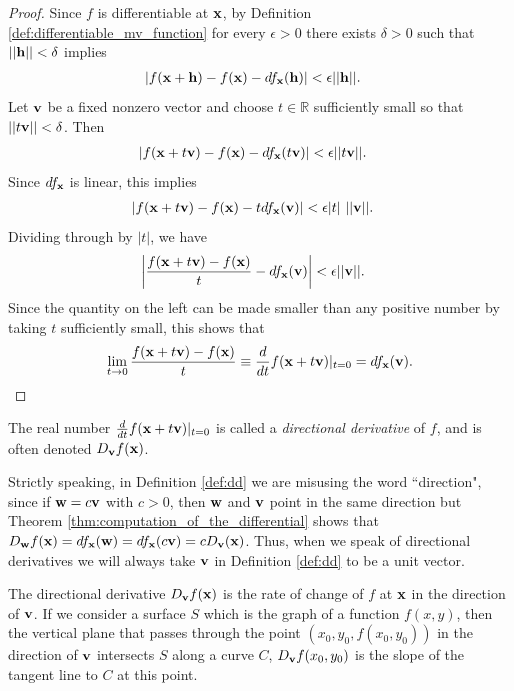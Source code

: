 \documentclass[12pt,letterpaper,reqno]{article}
\numberwithin{equation}{section}
\newcommand{\bh}{{\bf h}}
\newcommand{\R}{\ensuremath{\mathbb R}}
\newcommand{\bv}{{\bf v}}
\newcommand{\bw}{{\bf w}}
\newcommand{\bx}{{\bf x}}
\begin{document}
{\begin{proof}
	Since $f$ is differentiable at $\bx$, by Definition \ref{def:differentiable_mv_function} for every $\epsilon>0$ there exists $\delta>0$ such that $||\bh||<\delta$ implies
	\begin{align*}
		|f(\bx+\bh)-f(\bx)-df_\bx(\bh)|&<\epsilon ||\bh||.
	\end{align*}
	Let $\bv$ be a fixed nonzero vector and choose $t \in \R$ sufficiently small so that $||t \bv||<\delta$. Then 
	\begin{align*}
		|f(\bx+t\bv)-f(\bx)-df_\bx(t\bv)|&<\epsilon ||t\bv||.
	\end{align*} 
	Since $df_\bx$ is linear, this implies
	\begin{align*}
				|f(\bx+t\bv)-f(\bx)-t df_\bx(\bv)|&<\epsilon |t| \ ||\bv||.
	\end{align*}
	Dividing through by $|t|$, we have
	\begin{align*}
		\left|\frac{f(\bx+t\bv)-f(\bx)}{t}-df_\bx(\bv)\right|&<\epsilon||\bv||.
	\end{align*}
	Since the quantity on the left can be made smaller than any positive number by taking $t$ sufficiently small, this shows that
	\begin{align*}
		\lim_{t \to 0}\frac{f(\bx+t\bv)-f(\bx)}{t}\equiv \frac{d}{dt}f(\bx+t\bv)|_{t=0}=df_\bx(\bv).
	\end{align*}
\end{proof}

\begin{defn}\label{def:dd}
The real number	$\frac{d}{dt}f(\bx+t\bv)|_{t=0}$ is called a \emph{directional derivative} of $f$, and is often denoted $D_\bv f(\bx)$. 
\end{defn}

\begin{remark}
	Strictly speaking, in Definition \ref{def:dd} we are misusing the word ``direction", since if $\bw=c\bv$ with $c>0$, then $\bw$ and $\bv$ point in the same direction but Theorem \ref{thm:computation_of_the_differential} shows that $D_\bw f(\bx)=df_\bx(\bw)=df_\bx(c\bv)=cD_\bv(\bx)$. Thus, when we speak of directional derivatives we will always take $\bv$ in Definition \ref{def:dd} to be a unit vector.
\end{remark}

The directional derivative $D_\bv f(\bx)$ is the rate of change of $f$ at $\bx$ in the direction of $\bv$. If we consider a surface $S$ which is the graph of a function $f(x,y)$, then the vertical plane that passes through the point $(x_0,y_0,f(x_0,y_0))$ in the direction of $\bv$ intersects $S$ along a curve $C$, $D_\bv f(x_0,y_0)$ is the slope of the tangent line to $C$ at this point.

}
\end{document}
